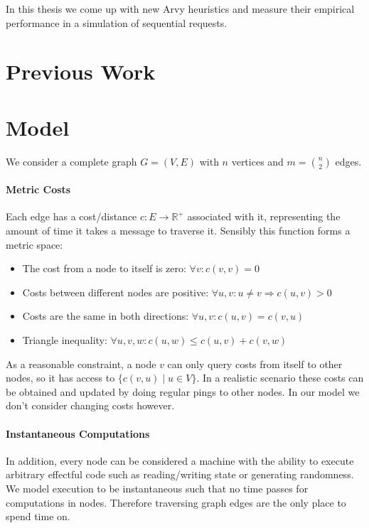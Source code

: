 \documentclass[a4paper, oneside]{discothesis}
\begin{document}
In this thesis we come up with new Arvy heuristics and measure their empirical performance in a simulation of sequential requests.

\section{Previous Work}

\TODO{}

\section{Model}
\label{model}

We consider a complete graph $G=(V,E)$ with $n$ vertices and $m=\binom{n}{2}$ edges.

\paragraph{Metric Costs} Each edge has a cost/distance $c : E \rightarrow \mathbb{R}^+$ associated with it, representing the amount of time it takes a message to traverse it. Sensibly this function forms a metric space:
\begin{itemize}
\item The cost from a node to itself is zero: $\forall v:c(v, v)=0$
\item Costs between different nodes are positive: $\forall u,v : u\neq v\Rightarrow c(u,v)>0$
\item Costs are the same in both directions: $\forall u,v : c(u,v)=c(v,u)$
\item Triangle inequality: $\forall u,v,w : c(u,w)\leq c(u,v)+c(v,w)$
\end{itemize}

As a reasonable constraint, a node $v$ can only query costs from itself to other nodes, so it has access to $\{c(v, u)\;|\;u\in V\}$. In a realistic scenario these costs can be obtained and updated by doing regular pings to other nodes. In our model we don't consider changing costs however.

\paragraph{Instantaneous Computations} In addition, every node can be considered a machine with the ability to execute arbitrary effectful code such as reading/writing state or generating randomness. We model execution to be instantaneous such that no time passes for computations in nodes. Therefore traversing graph edges are the only place to spend time on.
\end{document}
